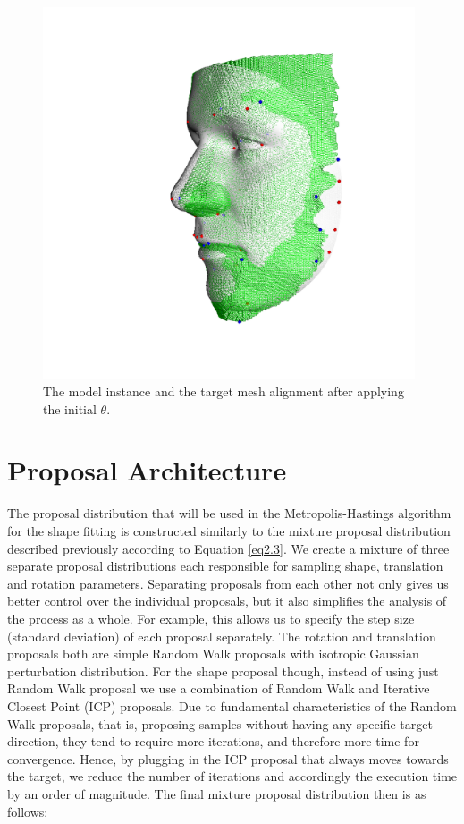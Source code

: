 \begin{figure}
\begin{minipage}{.32\textwidth}
  \end{minipage}
  \begin{minipage}{.32\textwidth}
    \centering
    \includegraphics[width=0.98\textwidth]{Figures/Pictures/initRAlt_t.png}
  \end{minipage}
  \caption{The model instance and the target mesh alignment after applying the initial $\theta$.}
  \label{f3.13}
\end{figure}

\section*{Proposal Architecture}
The proposal distribution that will be used in the Metropolis-Hastings algorithm for the shape fitting is constructed similarly to the mixture proposal distribution described previously according to Equation \ref{eq2.3}. We create a mixture of three separate proposal distributions each responsible for sampling shape, translation and rotation parameters. Separating proposals from each other not only gives us better control over the individual proposals, but it also simplifies the analysis of the process as a whole. For example, this allows us to specify the step size (standard deviation) of each proposal separately. The rotation and translation proposals both are simple Random Walk proposals with isotropic Gaussian perturbation distribution. For the shape proposal though, instead of using just Random Walk proposal we use a combination of Random Walk and Iterative Closest Point (ICP) proposals. Due to fundamental characteristics of the Random Walk proposals, that is, proposing samples without having any specific target direction, they tend to require more iterations, and therefore more time for convergence. Hence, by plugging in the ICP proposal that always moves towards the target, we reduce the number of iterations and accordingly the execution time by an order of magnitude. The final mixture proposal distribution then is as follows:

